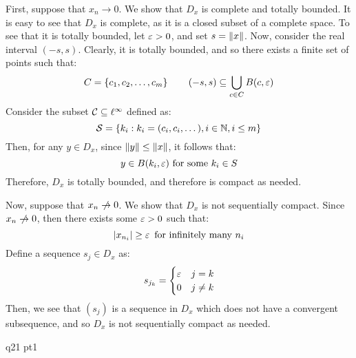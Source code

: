 \documentclass{article}
\begin{document}
\begin{soln}
    First, suppose that $ x_{n} \rightarrow 0 $.
    We show that $ D_{x} $ is complete and totally bounded. \vsp
    It is easy to see that $ D_{x} $ is complete, as it is a closed subset of a complete space.
    To see that it is totally bounded, let $ \operatorname{\varepsilon} > 0 $, and set $ s = \|x\| $. \vsp
    Now, consider the real interval $ (-s, s) $. Clearly, it is totally bounded, and so there
    exists a finite set of points such that:
    \begin{equation*}
        C = \left\{{c_{1}, c_{2}, \dots, c_{m}}\right\} \qquad
        (-s, s) \subseteq \bigcup_{c \in C} B(c, \operatorname{\varepsilon})
    \end{equation*}
    Consider the subset $ \mathcal{C} \subseteq \ell^{\infty} $ defined as:
    \begin{equation*}
        \mathcal{S} = \left\{{k_{i} : k_{i} = (c_{i}, c_{i}, \dots), i \in \mathbb{N}, i \leq m}\right\}
    \end{equation*}
    Then, for any $ y \in D_{x} $, since $ \|y\| \leq \|x\| $, it follows that:
    \begin{equation*}
        y \in B(k_{i}, \operatorname{\varepsilon}) \textrm{ for some } k_{i} \in S
    \end{equation*}
    Therefore, $ D_{x} $ is totally bounded, and therefore is compact as needed. \npgh

    Now, suppose that $ x_{n} \cnot\rightarrow 0 $.
    We show that $ D_{x} $ is not sequentially compact. \vsp
    Since $ x_{n} \cnot\rightarrow 0 $, then there exists some $ \operatorname{\varepsilon} > 0 $ such that:
    \begin{equation*}
        \abs{x_{n_{i}}} \geq \operatorname{\varepsilon} \textrm{ for infinitely many } n_{i}
    \end{equation*}
    Define a sequence $ s_{j} \in D_{x} $ as:
    \begin{equation*}
        s_{j_{k}} = \begin{cases} \operatorname{\varepsilon} & j = k \\ 0 & j \neq k \end{cases}
    \end{equation*}
    Then, we see that $ (s_{j}) $ is a sequence in $ D_{x} $ which does not have
    a convergent subsequence, and so $ D_{x} $ is not sequentially compact as needed.
\end{soln}

\newpage
{}

\begin{qu}
    q21 pt1
\end{qu}
\end{document}
